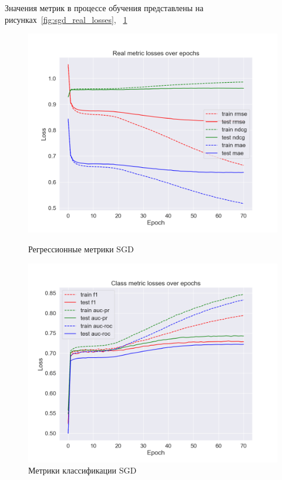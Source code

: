 Значения метрик в процессе обучения представлены на рисунках~\ref{fig:sgd_real_losses}, ~\ref{fig:sgd_class_losses}

\begin{figure}[h!]
\centering
\begin{minipage}{.5\textwidth}
\centering
\includegraphics[width=1.0\linewidth]{images/sgd/real_losses}
\caption{Регрессионные метрики SGD}
\label{fig:sgd_real_losses}
\end{minipage}%
\begin{minipage}{.5\textwidth}
\centering
\includegraphics[width=1.0\linewidth]{images/sgd/class_losses}
\caption{Метрики классификации SGD}
\label{fig:sgd_class_losses}
\end{minipage}
\end{figure}

